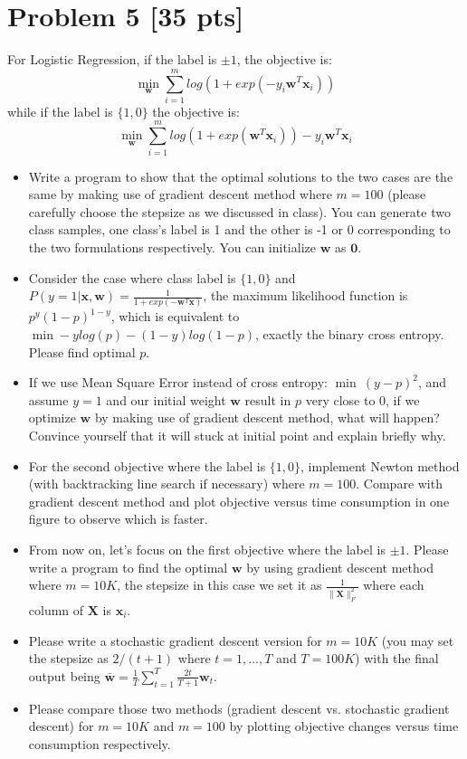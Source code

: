 \documentclass[11pt]{article}
\newcommand{\mtx}[1]{\mathbf{#1}}
\newcommand{\vct}[1]{\mathbf{#1}}
\def \mX {\mtx{X}}
\def \vzero    {\vct{0}}
\def \vw {\vct{w}}
\def \vx {\vct{x}}
\begin{document}
\section*{Problem 5 [35 pts]}
For Logistic Regression, if the label is $\pm1$, the objective is:
\begin{equation}
\min_\vw	\sum_{i=1}^{m}log(1+exp(-y_i\vw^T\vx_i))
\end{equation}
while if the label is $\{1,0\}$ the objective is:
\begin{equation}
	\min_\vw	\sum_{i=1}^{m}log(1+exp(\vw^T\vx_i))-y_i\vw^T\vx_i
\end{equation}
\begin{itemize}
	\item Write a program to show that the optimal solutions to the two cases  are the same by making use of gradient descent method where $m=100$ (please carefully choose the stepsize as we discussed in class). You can generate two class samples, one class's label is 1 and the other is -1 or 0 corresponding to the two formulations respectively. You can initialize $\vw$ as $\vzero$.
	\item Consider the case where class label is $\{1,0\}$ and $P(y=1|\vx,\vw)=\frac{1}{1+exp(-\vw^T\vx)}$, the maximum likelihood function is $p^y(1-p)^{1-y}$, which is equivalent to $\min -ylog(p)-(1-y)log(1-p)$, exactly the binary cross entropy. Please find optimal $p$.
	\item If we use Mean Square Error instead of cross entropy: $\min \ (y-p)^2$, and assume $y=1$ and our initial weight $\vw$ result in $p$ very close to 0, if we optimize $\vw$ by making use of gradient descent method, what will happen? Convince yourself that it will stuck at initial point and explain briefly why.
	\item For the second objective where the label is $\{1,0\}$, implement Newton method (with backtracking line search if necessary) where $m=100$.  Compare with gradient descent method and plot objective versus time consumption in one figure to observe which is faster.
	\item From now on, let's focus on the first objective where the label is $\pm1$. Please write a program to find the optimal  $\vw$ by using gradient descent method where $m=10K$, the stepsize in this case we set it as $\frac{1}{\|\mX\|_F^2}$ where each column of $\mX$ is $\vx_i$.
	\item Please write a stochastic gradient descent version for $m=10K$ (you may set the stepsize as $2/(t+1)$ where $t=1,\dots,T$ and $T=100K$) with the final output being $\bar{\vw}=\frac{1}{T}\sum_{t=1}^{T}\frac{2t}{T+1}\vw_t$.  
	\item Please compare those two methods (gradient descent vs. stochastic gradient descent) for $m=10K$ and $m=100$ by plotting objective changes versus time consumption respectively.
\end{itemize}
\end{document}
